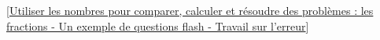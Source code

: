 [\href{https://cache.media.education.gouv.fr/file/Fractions/23/4/RA16_C4_MATH_fractions_flash4_travail_erreur_554234.pdf}
{Utiliser les nombres pour comparer, calculer et résoudre des problèmes :
les fractions - Un exemple de questions flash - Travail sur l'erreur}]